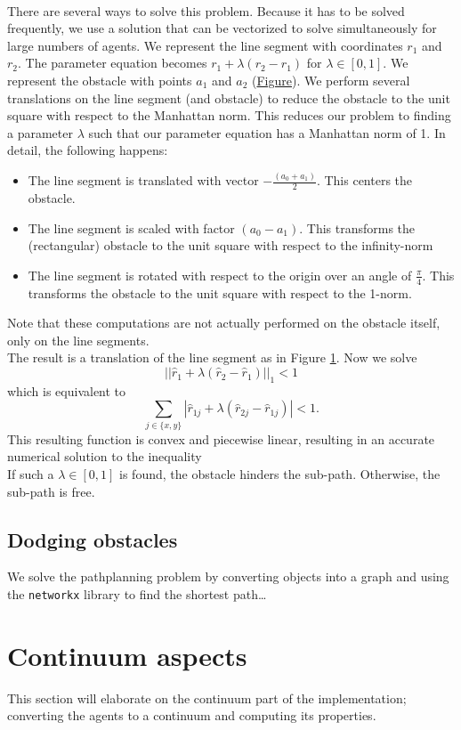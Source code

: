 \documentclass{article}
\begin{document}
\ \\
There are several ways to solve this problem. Because it has to be solved frequently, we use a solution that can be vectorized to solve simultaneously for large numbers of agents.
We represent the line segment with coordinates $r_1$ and $r_2$. The parameter equation becomes $r_1 + \lambda(r_2 - r_1)$ for $\lambda \in [0,1]$. We represent the obstacle with points $a_1$ and $a_2$ (\underline{Figure}). We perform several translations on the line segment (and obstacle) to reduce the obstacle to the unit square with respect to the Manhattan norm. This reduces our problem to finding a parameter $\lambda$ such that our parameter equation has a Manhattan norm of 1. In detail, the following happens:
\begin{itemize}
\item The line segment is translated with vector $-\frac{(a_0+a_1)}{2}$. This centers the obstacle.
\item The line segment is scaled with factor $(a_0-a_1)$. This transforms the (rectangular) obstacle to the unit square with respect to the infinity-norm
\item The line segment is rotated with respect to the origin over an angle of $\frac{\pi}{4}$. This transforms the obstacle to the unit square with respect to the 1-norm.
\end{itemize}
Note that these computations are not actually performed on the obstacle itself, only on the line segments.
\ \\
The result is a translation of the line segment as in Figure \ref{}. Now we solve 
$$||\hat{r}_1 + \lambda(\hat{r}_2-\hat{r}_1)||_1<1$$
which is equivalent to 
$$\sum_{j\in\{x,y\}}|\hat{r}_{1j} + \lambda(\hat{r}_{2j}-\hat{r}_{1j})|<1.$$
This resulting function is convex and piecewise linear, resulting in an accurate numerical solution to the inequality
\ \\
If such a $\lambda\in[0,1]$ is found, the obstacle hinders the sub-path. Otherwise, the sub-path is free.
\subsection{Dodging obstacles}
We solve the pathplanning problem by converting objects into a graph and using the \texttt{networkx} library \cite{networkx} to find the shortest path\dots
\newpage
\section{Continuum aspects}
This section will elaborate on the continuum part of the implementation; converting the agents to a continuum and computing its properties.
\end{document}
